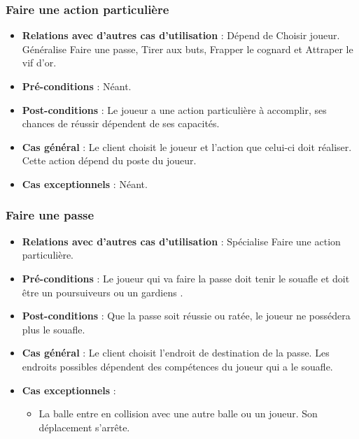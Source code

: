 \documentclass[a4paper,titlepage]{scrreprt}
\begin{document}
    \subsubsection{Faire une action particulière}
      \begin{itemize}
        \item \textbf{Relations avec d'autres cas d'utilisation}  : Dépend de Choisir joueur. Généralise Faire une passe, Tirer aux buts, Frapper le cognard et Attraper le vif d'or.
        \item \textbf{Pré-conditions} : Néant.
        \item \textbf{Post-conditions} : Le joueur a une action particulière à accomplir, ses chances de réussir dépendent de ses capacités.
        \item \textbf{Cas général} : Le client choisit le joueur et l’action que celui-ci doit réaliser. Cette action dépend du poste du joueur.
        \item \textbf{Cas exceptionnels} : Néant.
      \end{itemize}

    \subsubsection{Faire une passe}
      \begin{itemize}
        \item \textbf{Relations avec d'autres cas d'utilisation}  : Spécialise Faire une action particulière.
        \item \textbf{Pré-conditions} : Le joueur qui va faire la passe doit tenir le \gls{souafle} et doit être un \gls{poursuiveur}s  ou un \gls{gardien}s .
        \item \textbf{Post-conditions} : Que la passe soit réussie ou ratée, le joueur ne possédera plus le souafle.
        \item \textbf{Cas général} : Le client choisit l’endroit de destination de la passe. Les endroits possibles dépendent des compétences du joueur qui a le souafle. %
        \item \textbf{Cas exceptionnels} :
        \begin{itemize}
            \item La balle entre en collision avec une autre balle ou un joueur. Son déplacement s'arrête.
        \end{itemize}
      \end{itemize}
\end{document}
